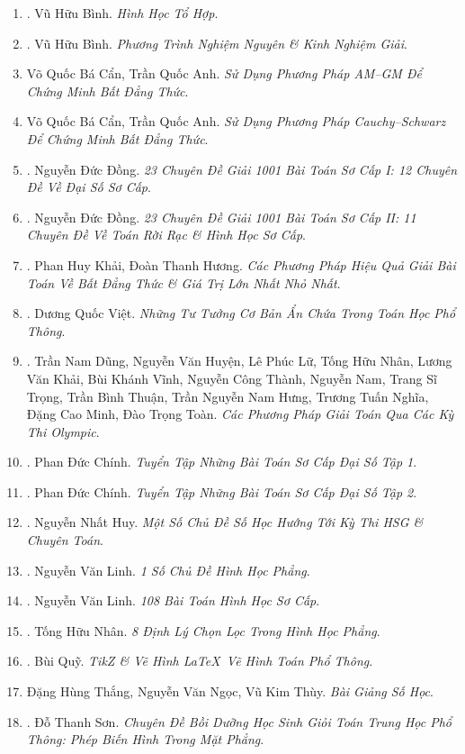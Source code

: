 \documentclass{article}
\begin{document}
\begin{enumerate}
	\item \cite{Binh_HHTH}. Vũ Hữu Bình. \textit{Hình Học Tổ Hợp}.\hfill{\sf[reading]}
	\item \cite{Binh_PTNN}. Vũ Hữu Bình. \textit{Phương Trình Nghiệm Nguyên \& Kinh Nghiệm Giải}.\hfill{\sf[reading]}
	\item Võ Quốc Bá Cẩn, Trần Quốc Anh. \textit{Sử Dụng Phương Pháp AM--GM Để Chứng Minh Bất Đẳng Thức}.
	\item Võ Quốc Bá Cẩn, Trần Quốc Anh. \textit{Sử Dụng Phương Pháp Cauchy--Schwarz Để Chứng Minh Bất Đẳng Thức}.
	\item \cite{Dong_23_1001_toan_I}. Nguyễn Đức Đồng. \textit{23 Chuyên Đề Giải 1001 Bài Toán Sơ Cấp I: 12 Chuyên Đề Về Đại Số Sơ Cấp}.\hfill{\sf[reading]}
	\item \cite{Dong_23_1001_toan_II}. Nguyễn Đức Đồng. \textit{23 Chuyên Đề Giải 1001 Bài Toán Sơ Cấp II: 11 Chuyên Đề Về Toán Rời Rạc \& Hình Học Sơ Cấp}.\hfill{\sf[reading]}
	\item \cite{Khai_Huong_bdt}. Phan Huy Khải, Đoàn Thanh Hương. \textit{Các Phương Pháp Hiệu Quả Giải Bài Toán Về Bất Đẳng Thức \& Giá Trị Lớn Nhất Nhỏ Nhất}.\hfill{\sf[reading]}
	\item \cite{Viet2014}. Dương Quốc Việt. \textit{Những Tư Tưởng Cơ Bản Ẩn Chứa Trong Toán Học Phổ Thông}.\hfill{\sf[done]}
	\item \cite{Dung_cac_phuong_phap_giai_toan_qua_cac_ky_thi_olympic_2022}. Trần Nam Dũng, Nguyễn Văn Huyện, Lê Phúc Lữ, Tống Hữu Nhân, Lương Văn Khải, Bùi Khánh Vĩnh, Nguyễn Công Thành, Nguyễn Nam, Trang Sĩ Trọng, Trần Bình Thuận, Trần Nguyễn Nam Hưng, Trương Tuấn Nghĩa, Đặng Cao Minh, Đào Trọng Toàn. \textit{Các Phương Pháp Giải Toán Qua Các Kỳ Thi Olympic}.\hfill{\sf[reading]}
	\item \cite{Chinh2021_tap_1}. Phan Đức Chính. \textit{Tuyển Tập Những Bài Toán Sơ Cấp Đại Số Tập 1}.\hfill{\sf[reading]}
	\item \cite{Chinh2021_tap_2}. Phan Đức Chính. \textit{Tuyển Tập Những Bài Toán Sơ Cấp Đại Số Tập 2}.\hfill{\sf[reading]}
	\item \cite{Huy_so_hoc}. Nguyễn Nhất Huy. \textit{Một Số Chủ Đề Số Học Hướng Tới Kỳ Thi HSG \& Chuyên Toán}.\hfill{\sf[reading]}
	\item \cite{Linh_topic_geometry}. Nguyễn Văn Linh. \textit{1 Số Chủ Đề Hình Học Phẳng}.\hfill{\sf[reading]}
	\item \cite{Linh_108_geometry}. Nguyễn Văn Linh. \textit{108 Bài Toán Hình Học Sơ Cấp}.\hfill{\sf[reading]}
	\item \cite{Nhan_8_geometry_theorem}. Tống Hữu Nhân. \textit{8 Định Lý Chọn Lọc Trong Hình Học Phẳng}.\hfill{\sf[reading]}
	\item \cite{Quy2022}. Bùi Quỹ. \textit{TikZ \& Vẽ Hình \LaTeX\ Vẽ Hình Toán Phổ Thông}.\hfill{\sf[reading]}
	\item Đặng Hùng Thắng, Nguyễn Văn Ngọc, Vũ Kim Thùy. \textit{Bài Giảng Số Học}.
	\item \cite{Son2006}. Đỗ Thanh Sơn. \textit{Chuyên Đề Bồi Dưỡng Học Sinh Giỏi Toán Trung Học Phổ Thông: Phép Biến Hình Trong Mặt Phẳng}.\hfill{\sf[reading]}	
\end{enumerate}
\end{document}
